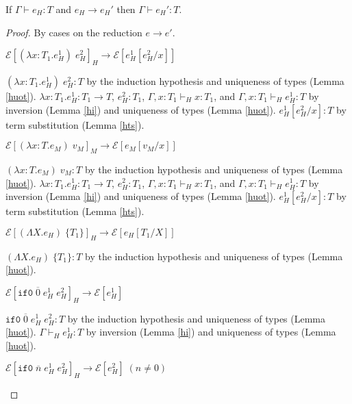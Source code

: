 \begin{theorem}
\label{hpn}
\onehalfspacing
If $\Gamma\vdash e_{H}:T$ and $e_{H}\rightarrow e_{H}'$ then $\Gamma\vdash e_{H}':T$.
\begin{proof}
By cases on the reduction $e\rightarrow e'$.
\begin{case}
$\mathscr{E}[(\lambda x:T_{1}.e_{H}^{1})\;e_{H}^{2}]_{H}\rightarrow\mathscr{E}[e_{H}^{1}[e_{H}^{2}/x]]$

$(\lambda x:T_{1}.e_{H}^{1})\;e_{H}^{2}:T$ by the induction hypothesis and uniqueness of types (Lemma \ref{huot}).  $\lambda x:T_{1}.e_{H}^{1}:T_{1}\rightarrow T$, $e_{H}^{2}:T_{1}$, $\Gamma,x:T_{1}\vdash_{H}x:T_{1}$, and $\Gamma,x:T_{1}\vdash_{H}e_{H}^{1}:T$ by inversion (Lemma \ref{hi}) and uniqueness of types (Lemma \ref{huot}).  $e_{H}^{1}[e_{H}^{2}/x]:T$ by term substitution (Lemma \ref{hts}).
\end{case}
\begin{case}
$\mathscr{E}[(\lambda x:T.e_{M})\;v_{M}]_{M}\rightarrow\mathscr{E}[e_{M}[v_{M}/x]]$

$(\lambda x:T.e_{M})\;v_{M}:T$ by the induction hypothesis and uniqueness of types (Lemma \ref{huot}).  $\lambda x:T_{1}.e_{H}^{1}:T_{1}\rightarrow T$, $e_{H}^{2}:T_{1}$, $\Gamma,x:T_{1}\vdash_{H}x:T_{1}$, and $\Gamma,x:T_{1}\vdash_{H}e_{H}^{1}:T$ by inversion (Lemma \ref{hi}) and uniqueness of types (Lemma \ref{huot}).  $e_{H}^{1}[e_{H}^{2}/x]:T$ by term substitution (Lemma \ref{hts}).
\end{case}
\begin{case}
$\mathscr{E}[(\Lambda X.e_{H})\;\lbrace T_{1}\rbrace]_{H}\rightarrow\mathscr{E}[e_{H}[T_{1}/X]]$

$(\Lambda X.e_{H})\;\lbrace T_{1}\rbrace:T$ by the induction hypothesis and uniqueness of types (Lemma \ref{huot}).

\end{case}
\begin{case}
$\mathscr{E}[\mathtt{if0}\;\overline{0}\;e_{H}^{1}\;e_{H}^{2}]_{H}\rightarrow\mathscr{E}[e_{H}^{1}]$

$\mathtt{if0}\;\overline{0}\;e_{H}^{1}\;e_{H}^{2}:T$ by the induction hypothesis and uniqueness of types (Lemma \ref{huot}).  $\Gamma\vdash_{H}e_{H}^{1}:T$ by inversion (Lemma \ref{hi}) and uniqueness of types (Lemma \ref{huot}).
\end{case}
\begin{case}
$\mathscr{E}[\mathtt{if0}\;\overline{n}\;e_{H}^{1}\;e_{H}^{2}]_{H}\rightarrow\mathscr{E}[e_{H}^{2}]\;(n\neq0)$


\end{case}
\end{proof}
\end{theorem}
